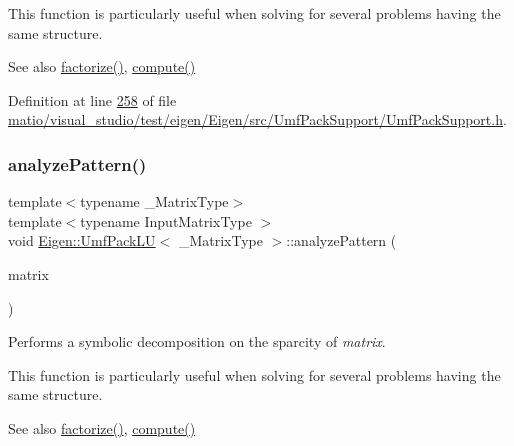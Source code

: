 This function is particularly useful when solving for several problems having the same structure.

\begin{DoxySeeAlso}{See also}
\hyperlink{class_eigen_1_1_umf_pack_l_u_a1471bf890503e743c45d75cc02a5345d}{factorize()}, \hyperlink{class_eigen_1_1_umf_pack_l_u_a05fb2b5717ebd67e46b83439721ceee7}{compute()} 
\end{DoxySeeAlso}


Definition at line \hyperlink{matio_2visual__studio_2test_2eigen_2_eigen_2src_2_umf_pack_support_2_umf_pack_support_8h_source_l00258}{258} of file \hyperlink{matio_2visual__studio_2test_2eigen_2_eigen_2src_2_umf_pack_support_2_umf_pack_support_8h_source}{matio/visual\+\_\+studio/test/eigen/\+Eigen/src/\+Umf\+Pack\+Support/\+Umf\+Pack\+Support.\+h}.

\mbox{\label{class_eigen_1_1_umf_pack_l_u_ac7ea28b2017d6b26b7b08497f294e5e6}} 
\subsubsection{\texorpdfstring{analyze\+Pattern()}{analyzePattern()}\hspace{0.1cm}{\footnotesize\ttfamily [2/2]}}
{\footnotesize\ttfamily template$<$typename \+\_\+\+Matrix\+Type$>$ \\
template$<$typename Input\+Matrix\+Type $>$ \\
void \hyperlink{class_eigen_1_1_umf_pack_l_u}{Eigen\+::\+Umf\+Pack\+LU}$<$ \+\_\+\+Matrix\+Type $>$\+::analyze\+Pattern (\begin{DoxyParamCaption}\item[{const Input\+Matrix\+Type \&}]{matrix }\end{DoxyParamCaption})\hspace{0.3cm}{\ttfamily [inline]}}

Performs a symbolic decomposition on the sparcity of {\itshape matrix}.

This function is particularly useful when solving for several problems having the same structure.

\begin{DoxySeeAlso}{See also}
\hyperlink{class_eigen_1_1_umf_pack_l_u_a1471bf890503e743c45d75cc02a5345d}{factorize()}, \hyperlink{class_eigen_1_1_umf_pack_l_u_a05fb2b5717ebd67e46b83439721ceee7}{compute()} 
\end{DoxySeeAlso}


